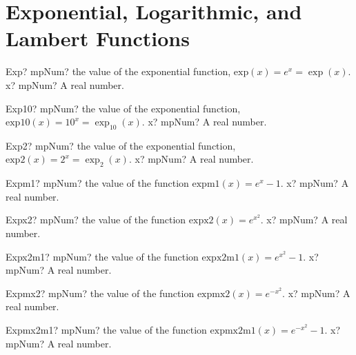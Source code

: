 \documentclass[12pt,a4paper,openany]{book}
\begin{document}
\section{Exponential, Logarithmic, and Lambert Functions}

\begin{mpFunctionsExtract}
\mpFunctionOne
{Exp? mpNum? the value of the exponential function,  $\text{exp}(x) = e^x = \exp(x)$.}
{x? mpNum? A real number.}
\end{mpFunctionsExtract}

\begin{mpFunctionsExtract}
\mpFunctionOne
{Exp10? mpNum? the value of the exponential function, $\text{exp10}(x) = 10^x = \exp_{10}(x)$.}
{x? mpNum? A real number.}
\end{mpFunctionsExtract}

\begin{mpFunctionsExtract}
\mpFunctionOne
{Exp2? mpNum? the value of the exponential function, $\text{exp2}(x) = 2^x = \exp_2(x)$.}
{x? mpNum? A real number.}
\end{mpFunctionsExtract}

\begin{mpFunctionsExtract}
\mpFunctionOne
{Expm1? mpNum? the value of the function $\text{expm1}(x) = e^{x}-1$.}
{x? mpNum? A real number.}
\end{mpFunctionsExtract}

\begin{mpFunctionsExtract}
\mpFunctionOne
{Expx2? mpNum? the value of the function $\text{expx2}(x) = e^{x^2}$.}
{x? mpNum? A real number.}
\end{mpFunctionsExtract}

\begin{mpFunctionsExtract}
\mpFunctionOne
{Expx2m1? mpNum? the value of the function $\text{expx2m1}(x) = e^{x^2}-1$.}
{x? mpNum? A real number.}
\end{mpFunctionsExtract}

\begin{mpFunctionsExtract}
\mpFunctionOne
{Expmx2? mpNum? the value of the function $\text{expmx2}(x) = e^{-x^2}$.}
{x? mpNum? A real number.}
\end{mpFunctionsExtract}

\begin{mpFunctionsExtract}
\mpFunctionOne
{Expmx2m1? mpNum? the value of the function $\text{expmx2m1}(x) = e^{-x^2}-1$.}
{x? mpNum? A real number.}
\end{mpFunctionsExtract}
\end{document}
